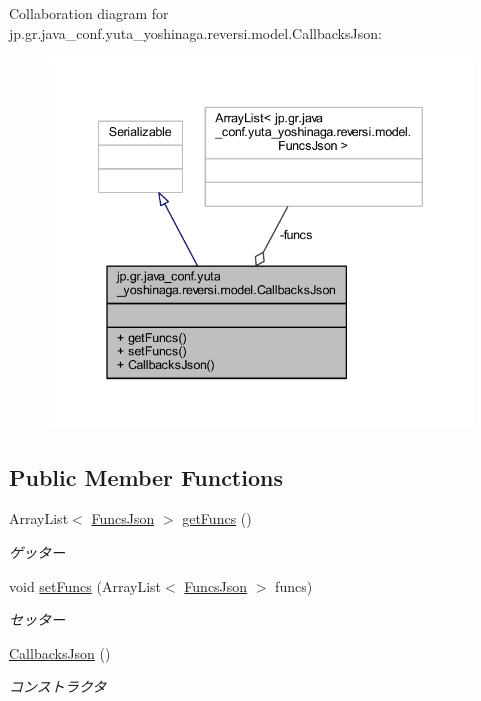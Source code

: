 Collaboration diagram for jp.\+gr.\+java\+\_\+conf.\+yuta\+\_\+yoshinaga.\+reversi.\+model.\+Callbacks\+Json\+:\nopagebreak
\begin{figure}[H]
\begin{center}
\leavevmode
\includegraphics[width=340pt]{classjp_1_1gr_1_1java__conf_1_1yuta__yoshinaga_1_1reversi_1_1model_1_1_callbacks_json__coll__graph}
\end{center}
\end{figure}
\subsection*{Public Member Functions}
\begin{DoxyCompactItemize}
\item 
Array\+List$<$ \mbox{\hyperlink{classjp_1_1gr_1_1java__conf_1_1yuta__yoshinaga_1_1reversi_1_1model_1_1_funcs_json}{Funcs\+Json}} $>$ \mbox{\hyperlink{classjp_1_1gr_1_1java__conf_1_1yuta__yoshinaga_1_1reversi_1_1model_1_1_callbacks_json_af9a62a3dbe6416793c01d7a0f69da2b1}{get\+Funcs}} ()
\begin{DoxyCompactList}\small\item\em ゲッター \end{DoxyCompactList}\item 
void \mbox{\hyperlink{classjp_1_1gr_1_1java__conf_1_1yuta__yoshinaga_1_1reversi_1_1model_1_1_callbacks_json_a6de1fc00c131167b4fe6231a660bdb6e}{set\+Funcs}} (Array\+List$<$ \mbox{\hyperlink{classjp_1_1gr_1_1java__conf_1_1yuta__yoshinaga_1_1reversi_1_1model_1_1_funcs_json}{Funcs\+Json}} $>$ funcs)
\begin{DoxyCompactList}\small\item\em セッター \end{DoxyCompactList}\item 
\mbox{\hyperlink{classjp_1_1gr_1_1java__conf_1_1yuta__yoshinaga_1_1reversi_1_1model_1_1_callbacks_json_acdc36faba755660c46ab3d1641d18e67}{Callbacks\+Json}} ()
\begin{DoxyCompactList}\small\item\em コンストラクタ \end{DoxyCompactList}\end{DoxyCompactItemize}
